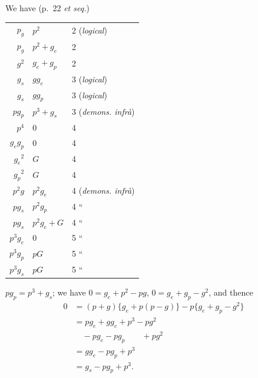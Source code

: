 \documentclass[11pt,a4paper,english]{article}
\theoremstyle{plain}
\begin{document}
We have (p.\ 22 \textit{et seq.})

\begin{center}
\begin{tabular}{r @{\ $=$\ }l @{\qquad} l}
$p_g$ & $p^2$ & 2 (\textit{logical}) \\
$p_g$ & $p^2 + g_e$ & 2 \\
$g^2$ & $g_e + g_p$ & 2 \\
$g_s$ & $gg_e$ & 3 (\textit{logical}) \\
$g_s$ & $gg_p$ & 3 (\textit{logical}) \\
$pg_p$ & $p^3 + g_s$ & 3 (\textit{demons. infr\`{a}}) \\
$p^4$ & $0$ & 4 \\
$g_eg_p$ & $0$ & 4 \\
${g_e}^2$ & $G$ & 4 \\
${g_p}^2$ & $G$ & 4 \\
$p^2g$ & $p^2g_e$ & 4 (\textit{demons. infr\`{a}}) \\
$pg_s$ & $p^2g_p$ & 4 \hspace{2em} `` \hspace{2em} \\
$pg_s$ & $p^2g_e + G$ & 4 \hspace{2em} `` \hspace{2em} \\
$p^3g_e$ & $0$ & 5 \hspace{2em} `` \hspace{2em} \\
$p^3g_p$ & $pG$ & 5 \hspace{2em} `` \hspace{2em} \\
$p^3g_s$ & $pG$ & 5 \hspace{2em} `` \hspace{2em} \\
\end{tabular}
\end{center}

$pg_p = p^3 + g_s$; we have $0 = g_e + p^2 - pg$, $0 = g_e + g_p - g^2$, and thence
\begin{align*}
0 &= (p + g)\{g_e + p(p-g)\} - p\{g_e + g_p - g^2\} \\
&= pg_e + gg_e + p^3 - pg^2 \\
&\quad - pg_e - pg_p \quad\quad + pg^2 \\
&= gg_e - pg_p + p^3 \\
&= g_s - pg_p + p^3.
\end{align*}
\end{document}

